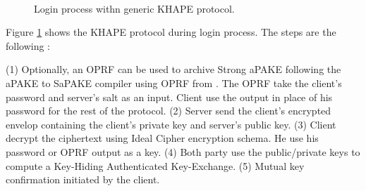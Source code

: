 \documentclass[../report.tex]{subfiles}
\begin{document}



\paragraph{}


\begin{figure}[h]
 \centering
 
 \setlength{\fboxsep}{10pt}
 \setlength{\fboxrule}{1pt}
 
 \caption{Login process withn generic KHAPE protocol.}
 \label{fig:Generic_KHAPE}
\end{figure}

Figure \ref{fig:Generic_KHAPE} shows the KHAPE protocol during login process.
The steps are the following :

(1) Optionally, an OPRF can be used to archive Strong aPAKE following the aPAKE to SaPAKE compiler using OPRF from \cite{OPAQUE_Paper}. The OPRF take the client's password and server's salt as an input. Client use the output in place of his password for the rest of the protocol.
(2) Server send the client's encrypted envelop containing the client's private key and server's public key.
(3) Client decrypt the ciphertext using Ideal Cipher encryption schema. He use his password or OPRF output as a key.
(4) Both party use the public/private keys to compute a Key-Hiding Authenticated Key-Exchange.
(5) Mutual key confirmation initiated by the client.
\end{document}
